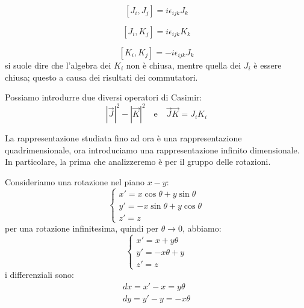 \begin{equation}
    \left[J_i,J_j\right]=i\epsilon_{ijk}J_k
\end{equation}

\begin{equation}
    \left[J_i,K_j\right]=i\epsilon_{ijk}K_k
\end{equation}

\begin{equation}
    \left[K_i,K_j\right]=-i\epsilon_{ijk}J_k
\end{equation}
si suole dire che l'algebra dei $K_i$ non è chiusa, mentre quella dei $J_i$ è essere chiusa; questo a causa dei risultati dei commutatori.

Possiamo introdurre due diversi operatori di Casimir:
\begin{equation}
   |\Vec{J}|^2-|\Vec{K}|^2 \quad \text{e}\quad \Vec{J}\Vec{K}=J_iK_i
\end{equation}

La rappresentazione studiata fino ad ora è una rappresentazione quadrimensionale, ora introduciamo una rappresentazione infinito dimensionale. In particolare, la prima che analizzeremo è per il gruppo delle rotazioni.

Consideriamo una rotazione nel piano $x-y$:
\begin{equation}
    \begin{cases}
        x'=x\cos{\theta}+y\sin{\theta} \\
        y'=-x\sin{\theta}+y\cos{\theta} \\
        z'=z
    \end{cases}
\end{equation}
per una rotazione infinitesima, quindi per $\theta\xrightarrow{}0$, abbiamo:
\begin{equation}
    \begin{cases}
        x'=x+y\theta \\
        y'=-x\theta+y \\
        z'=z
    \end{cases}
\end{equation}
i differenziali sono:
\begin{equation}
    \begin{gathered}
        dx=x'-x=y\theta\\
        dy=y'-y=-x\theta
    \end{gathered}
\end{equation}

